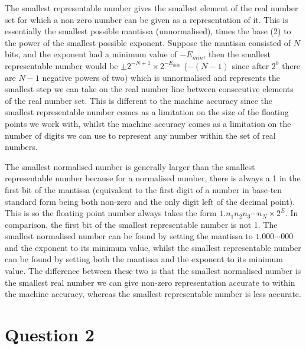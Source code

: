 \documentclass{article}
\begin{document}
The smallest representable number gives the smallest element of the real number set for which a non-zero number can be given as a representation of it. This is essentially the smallest possible mantissa (unnormalised), times the base (2) to the power of the smallest possible exponent. Suppose the mantissa consisted of $N$ bits, and the exponent had a minimum value of $-E_{min}$, then the smallest representable number would be $\pm 2^{-N+1}\times{2^{-E_{min}}}$ ($-(N-1)$ since after $2^0$ there are $N-1$ negative powers of two) which is unnormalised and represents the smallest step we can take on the real number line between consecutive elements of the real number set. This is different to the machine accuracy since the smallest representable number comes as a limitation on the size of the floating points we work with, whilst the machine accuracy comes as a limitation on the number of digits we can use to represent any number within the set of real numbers. 

The smallest normalised number is generally larger than the smallest representable number because for a normalised number, there is always a 1 in the first bit of the mantissa (equivalent to the first digit of a number in base-ten standard form being both non-zero and the only digit left of the decimal point). This is so the floating point number always takes the form $1.n_1n_2n_3\cdots{n_N}\times2^{E}$. In comparison, the first bit of the smallest representable number is not 1. The smallest normalised number can be found by setting the mantissa to $1.000\cdots{000}$ and the exponent to its minimum value, whilst the smallest representable number can be found by setting both the mantissa and the exponent to its minimum value. The difference between these two is that the smallest normalised number is the smallest real number we can give non-zero representation accurate to within the machine accuracy, whereas the smallest representable number is less accurate.
 \newline

\section{Question 2}
\end{document}
